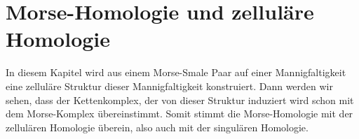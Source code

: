 \documentclass[a4paper,11pt,twoside]{scrreport}
\begin{document}



\chapter{Morse-Homologie und zelluläre Homologie}

In diesem Kapitel wird aus einem Morse-Smale Paar auf einer Mannigfaltigkeit
eine zelluläre Struktur dieser Mannigfaltigkeit konstruiert. Dann werden wir 
sehen, dass der Kettenkomplex, der von dieser Struktur induziert wird schon mit
dem Morse-Komplex übereinstimmt. Somit stimmt die Morse-Homologie mit der 
zellulären Homologie überein, also auch mit der singulären Homologie.






% 

\printbibliography

\eject
\end{document}
